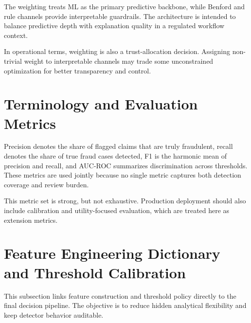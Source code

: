 \documentclass[12pt,a4paper]{report}
\begin{document}
The weighting treats ML as the primary predictive backbone, while Benford and rule channels provide interpretable guardrails. The architecture is intended to balance predictive depth with explanation quality in a regulated workflow context.

In operational terms, weighting is also a trust-allocation decision. Assigning non-trivial weight to interpretable channels may trade some unconstrained optimization for better transparency and control.

\section{Terminology and Evaluation Metrics}
Precision denotes the share of flagged claims that are truly fraudulent, recall denotes the share of true fraud cases detected, F1 is the harmonic mean of precision and recall, and AUC-ROC summarizes discrimination across thresholds. These metrics are used jointly because no single metric captures both detection coverage and review burden.

This metric set is strong, but not exhaustive. Production deployment should also include calibration and utility-focused evaluation, which are treated here as extension metrics.

\section{Feature Engineering Dictionary and Threshold Calibration}
This subsection links feature construction and threshold policy directly to the final decision pipeline. The objective is to reduce hidden analytical flexibility and keep detector behavior auditable.
\end{document}
